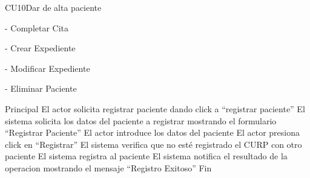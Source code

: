 \begin{UseCase}{CU10}{Dar de alta paciente}
{					-	Completar Cita
					
					-	Crear Expediente
					
					-	Modificar Expediente
					
					-	Eliminar Paciente
		}
	\end{UseCase}
	
\begin{UCtrayectoria}{Principal}
	\UCpaso	El actor solicita registrar paciente dando click a “registrar paciente”
	\UCpaso El sistema solicita los datos del paciente a registrar mostrando el formulario “Registrar Paciente”
	\UCpaso El actor introduce los datos del paciente
	\UCpaso El actor presiona click en “Registrar”
	\UCpaso El sistema verifica que no esté registrado el CURP con otro paciente
	\UCpaso El sistema registra al paciente
	\UCpaso El sistema notifica el resultado de la operacion mostrando el mensaje “Registro Exitoso”
	\UCpaso Fin
\end{UCtrayectoria}


